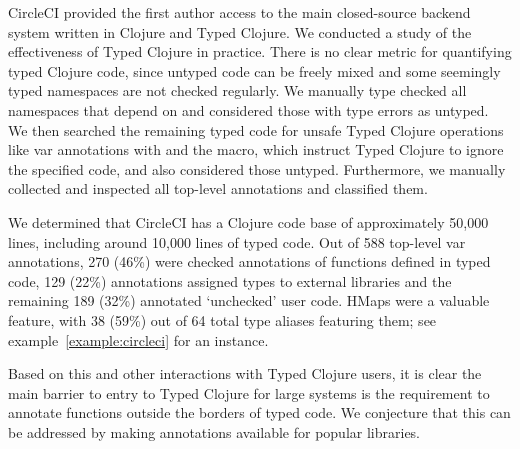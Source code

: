 CircleCI provided the first author access to the main closed-source backend system written in Clojure
and Typed Clojure.
We conducted a study of the effectiveness of Typed Clojure in practice.
There is no clear metric for quantifying typed Clojure code, since untyped code
can be freely mixed and some seemingly typed namespaces are not checked
regularly. We manually type checked all namespaces that depend on 
and considered those with type errors as untyped.
We then searched the remaining typed code for unsafe Typed Clojure operations like
var annotations with  and the  macro,
which instruct Typed Clojure to ignore the specified code,
and also considered those untyped.
Furthermore, we manually collected and inspected all top-level annotations and
classified them.

We determined that
CircleCI has a Clojure code base of approximately 50,000 lines, including around 10,000 
lines of typed code.
Out of 588 top-level var annotations, 270 (46\%) were checked annotations of
functions defined in typed code,
129 (22\%) annotations assigned types to external libraries 
and the remaining 189 (32\%) annotated `unchecked' user code.
HMaps were a valuable feature, with 38 (59\%) out of 64 total type aliases
featuring them; see example~\ref{example:circleci} for an instance.

Based on this and other interactions with Typed Clojure users,
it is clear the main barrier to entry to Typed Clojure for large systems is the requirement
to annotate functions outside the borders of typed code.
We conjecture that this can be addressed by making annotations available for popular libraries.





